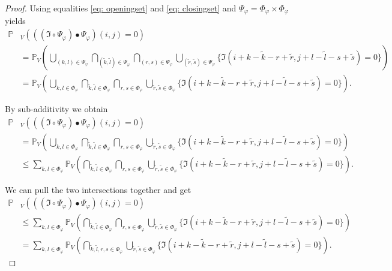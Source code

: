 \documentclass[a4paper,12pt]{article}
\theoremstyle{plain}
\theoremstyle{definition}
\begin{document}
\begin{appendix}
\begin{proof}
		Using equalities \eqref{eq: openingset} and \eqref{eq: closingset} and $\Psi_\varphi = \Phi_\varphi \times \Phi_\varphi$ yields
		\begin{align*}
			\mathbb{P}&_V\left( ((\mathfrak{I} \circ \Psi_\varphi) \bullet \Psi_\varphi)(i, j) = 0 \right) \\
			&= \mathbb{P}_V\left( \bigcup_{(k, l) \in \Psi_\varphi} \bigcap_{(\tilde{k}, \tilde{l}) \in \Psi_\varphi} \bigcap_{(r, s) \in \Psi_\varphi} \bigcup_{(\tilde{r}, \tilde{s}) \in \Psi_\varphi} \{ \mathfrak{I}(i + k - \tilde{k} - r + \tilde{r}, j + l - \tilde{l} - s + \tilde{s}) = 0 \} \right) \\
			&= \mathbb{P}_V\left( \bigcup_{k, l \in \Phi_\varphi} \bigcap_{\tilde{k}, \tilde{l} \in \Phi_\varphi} \bigcap_{r, s \in \Phi_\varphi} \bigcup_{\tilde{r}, \tilde{s} \in \Phi_\varphi} \{ \mathfrak{I}(i + k - \tilde{k} - r + \tilde{r}, j + l - \tilde{l} - s + \tilde{s}) = 0 \} \right).
		\end{align*}
		
		By sub-additivity we obtain
		\begin{align*}
			\mathbb{P}&_V\left( ((\mathfrak{I} \circ \Psi_\varphi) \bullet \Psi_\varphi)(i, j) = 0 \right) \\
			&= \mathbb{P}_V\left( \bigcup_{k, l \in \Phi_\varphi} \bigcap_{\tilde{k}, \tilde{l} \in \Phi_\varphi} \bigcap_{r, s \in \Phi_\varphi} \bigcup_{\tilde{r}, \tilde{s} \in \Phi_\varphi} \{ \mathfrak{I}(i + k - \tilde{k} - r + \tilde{r}, j + l - \tilde{l} - s + \tilde{s}) = 0 \} \right) \\
			&\leq \sum_{k, l \in \Phi_\varphi} \mathbb{P}_V\left( \bigcap_{\tilde{k}, \tilde{l} \in \Phi_\varphi} \bigcap_{r, s \in \Phi_\varphi} \bigcup_{\tilde{r}, \tilde{s} \in \Phi_\varphi} \{ \mathfrak{I}(i + k - \tilde{k} - r + \tilde{r}, j + l - \tilde{l} - s + \tilde{s}) = 0 \} \right).
		\end{align*}
		
		We can pull the two intersections together and get
		\begin{align*}
			\mathbb{P}&_V\left( ((\mathfrak{I} \circ \Psi_\varphi) \bullet \Psi_\varphi)(i, j) = 0 \right) \\
			&\leq \sum_{k, l \in \Phi_\varphi} \mathbb{P}_V\left( \bigcap_{\tilde{k}, \tilde{l} \in \Phi_\varphi} \bigcap_{r, s \in \Phi_\varphi} \bigcup_{\tilde{r}, \tilde{s} \in \Phi_\varphi} \{ \mathfrak{I}(i + k - \tilde{k} - r + \tilde{r}, j + l - \tilde{l} - s + \tilde{s}) = 0 \} \right) \\
			&= \sum_{k, l \in \Phi_\varphi} \mathbb{P}_V\left( \bigcap_{\tilde{k}, \tilde{l}, r, s \in \Phi_\varphi} \bigcup_{\tilde{r}, \tilde{s} \in \Phi_\varphi} \{ \mathfrak{I}(i + k - \tilde{k} - r + \tilde{r}, j + l - \tilde{l} - s + \tilde{s}) = 0 \} \right).
		\end{align*}
		

\end{proof}
\end{appendix}
\end{document}
